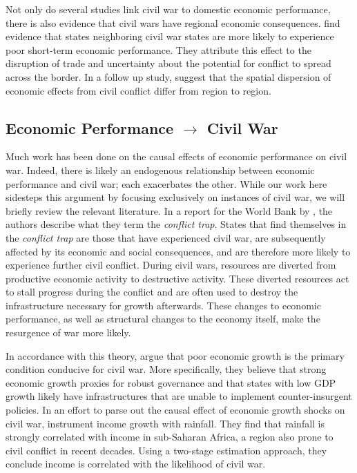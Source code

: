 Not only do several studies link civil war to domestic economic performance, there is also evidence that civil wars have regional economic consequences. \citet{murdoch:sandler:2002a} find evidence that states neighboring civil war states are more likely to experience poor short-term economic performance. They attribute this effect to the disruption of trade and uncertainty about the potential for conflict to spread across the border. In a follow up study, \citet{murdoch:sandler:2002b} suggest that the spatial dispersion of economic effects from civil conflict differ from region to region.

\subsection{Economic Performance $\rightarrow$ Civil War}

Much work has been done on the causal effects of economic performance on civil war. Indeed, there is likely an endogenous relationship between economic performance and civil war; each exacerbates the other. While our work here sidesteps this argument by focusing exclusively on instances of civil war, we will briefly review the relevant literature. In a report for the World Bank by \citet{collier:etal:2003}, the authors describe what they term the \textit{conflict trap}. States that find themselves in the \textit{conflict trap} are those that have experienced civil war, are subsequently affected by its economic and social consequences, and are therefore more likely to experience further civil conflict. During civil wars, resources are diverted from productive economic activity to destructive activity. These diverted resources act to stall progress during the conflict and are often used to destroy the infrastructure necessary for growth afterwards. These changes to economic performance, as well as structural changes to the economy itself, make the resurgence of war more likely. 

In accordance with this theory, \citet{fearon:laitin:2003} argue that poor economic growth is the primary condition conducive for civil war. More specifically, they believe that strong economic growth proxies for robust governance and that states with low GDP growth likely have infrastructures that are unable to implement counter-insurgent policies. In an effort to parse out the causal effect of economic growth shocks on civil war, \citet{miguel:etal:2004} instrument income growth with rainfall. They find that rainfall is strongly correlated with income in sub-Saharan Africa, a region also prone to civil conflict in recent decades.  Using a two-stage estimation approach, they conclude income is correlated with the likelihood of civil war.

